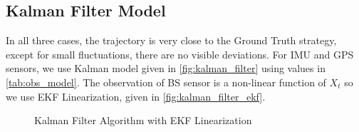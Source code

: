 \subsection{Kalman Filter Model}
In all three cases, the trajectory is very close to the Ground Truth strategy, except for small fluctuations, there are no visible deviations.
For IMU and GPS sensors, we use Kalman model given in \autoref{fig:kalman_filter}  using values in \autoref{tab:obs_model}. The observation of BS sensor is a non-linear function of $X_t$ so we use EKF Linearization, given in \autoref{fig:kalman_filter_ekf}.

\begin{figure}[H]
    \centering
    \caption{Kalman Filter Algorithm with EKF Linearization}
    \label{fig:kalman_filter_ekf}
\end{figure}



